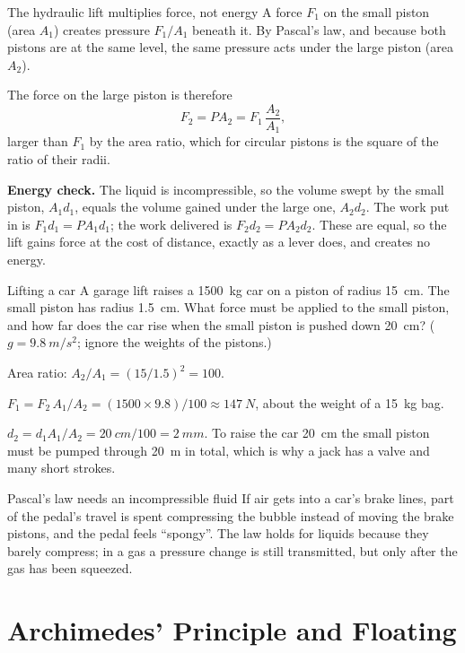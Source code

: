 \begin{derivbox}{The hydraulic lift multiplies force, not energy}
 A force $F_1$ on the small piston (area $A_1$) creates pressure $F_1/A_1$ beneath it. By Pascal's
law, and because both pistons are at the same level, the same pressure acts under the large piston (area
$A_2$).

 The force on the large piston is therefore
\[
F_2=PA_2=F_1\,\frac{A_2}{A_1},
\]
larger than $F_1$ by the area ratio, which for circular pistons is the square of the ratio of their radii.

 \textbf{Energy check.} The liquid is incompressible, so the volume swept by the small piston,
$A_1d_1$, equals the volume gained under the large one, $A_2d_2$. The work put in is
$F_1d_1=PA_1d_1$; the work delivered is $F_2d_2=PA_2d_2$. These are equal, so the lift gains force at the
cost of distance, exactly as a lever does, and creates no energy.
\end{derivbox}

\begin{exbox}{Lifting a car}\label{ex:fluids-carlift}
A garage lift raises a \SI{1500}{kg} car on a piston of radius \SI{15}{cm}. The small piston has radius
\SI{1.5}{cm}. What force must be applied to the small piston, and how far does the car rise when the small
piston is pushed down \SI{20}{cm}? ($g=\SI{9.8}{m/s^2}$; ignore the weights of the pistons.)

 Area ratio: $A_2/A_1=(15/1.5)^2=100$.

 $F_1=F_2\,A_1/A_2=(1500\times9.8)/100\approx\SI{147}{N}$, about the weight of a \SI{15}{kg} bag.

 $d_2=d_1A_1/A_2=\SI{20}{cm}/100=\SI{2}{mm}$. To raise the car \SI{20}{cm} the small piston must
be pumped through \SI{20}{m} in total, which is why a jack has a valve and many short strokes.
\end{exbox}

\begin{trapbox}{Pascal's law needs an incompressible fluid}
If air gets into a car's brake lines, part of the pedal's travel is spent compressing the bubble instead
of moving the brake pistons, and the pedal feels ``spongy''. The law holds for liquids because they barely
compress; in a gas a pressure change is still transmitted, but only after the gas has been squeezed.
\end{trapbox}

\section{Archimedes' Principle and Floating}\label{sec:archimedes}

